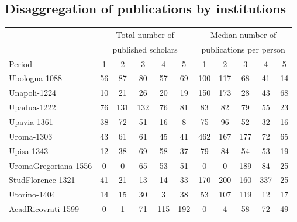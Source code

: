 \clearpage
\subsection{Disaggregation of publications by institutions}\label{app:pub-by-instit}



\begin{table}[hb]
\centering
		\begin{tabular}{@{ \extracolsep{3pt}}lcccccccccc}
\toprule
			& \multicolumn{5}{c}{Total number of }  & \multicolumn{5}{c}{Median number of }\\
			& \multicolumn{5}{c}{published scholars}  & \multicolumn{5}{c}{ publications per person}\\
			Period   & 1 &2 & 3 & 4 & 5  & 1 &2 & 3 & 4 & 5\\
\midrule
Ubologna-1088 & 56       & 87       & 80       & 57       & 69       & 100      & 117      & 68       & 41       & 14 \\
Unapoli-1224 & 10       & 21       & 26       & 20       & 19       & 150      & 173      & 28       & 43       & 68 \\
Upadua-1222 & 76       & 131      & 132      & 76       & 81       & 83       & 82       & 79       & 55       & 23 \\
Upavia-1361 & 38       & 72       & 51       & 16       & 8        & 75       & 96       & 52       & 32       & 16 \\
Uroma-1303 & 43       & 61       & 61       & 45       & 41       & 462      & 167      & 177      & 72       & 65 \\
Upisa-1343 & 12       & 38       & 69       & 58       & 37       & 79       & 84       & 54       & 53       & 19 \\
UromaGregoriana-1556 & 0        & 0        & 65       & 53       & 51       & 0        & 0        & 189      & 84       & 25 \\
StudFlorence-1321 & 41       & 21       & 13       & 14       & 33       & 170      & 200      & 160      & 337      & 25 \\
Utorino-1404 & 14       & 15       & 30       & 3        & 38       & 53       & 107      & 119      & 12       & 17 \\
AcadRicovrati-1599 & 0        & 1        & 71       & 115      & 192      & 0        & 4        & 58       & 72       & 49 \\

\end{tabular}
\end{table}
